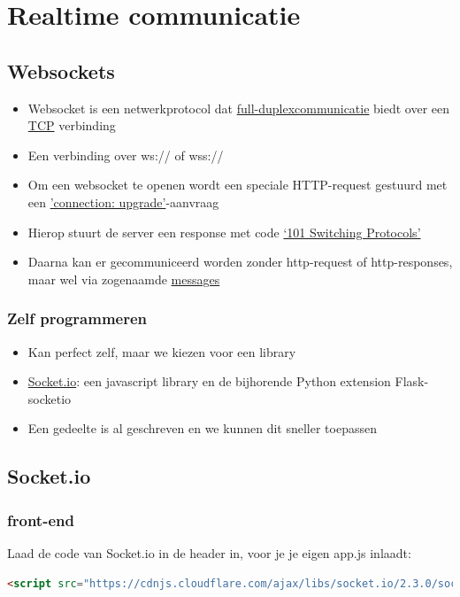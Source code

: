 \documentclass{article}
\begin{document}
\section{Realtime communicatie}
\subsection{Websockets}
\begin{itemize}
    \item Websocket is een netwerkprotocol dat \underline{full-duplexcommunicatie} biedt over een \underline{TCP} verbinding
    \item Een verbinding over ws:// of wss://
    \item Om een websocket te openen wordt een speciale HTTP-request gestuurd met een \underline{'connection: upgrade'}-aanvraag
    \item Hierop stuurt de server een response met code \underline{`101 Switching Protocols'}
    \item Daarna kan er gecommuniceerd worden zonder http-request of http-responses, maar wel via zogenaamde \underline{messages}
\end{itemize}

\subsubsection{Zelf programmeren}
\begin{itemize}
    \item Kan perfect zelf, maar we kiezen voor een library
    \item \underline{Socket.io}: een javascript library en de bijhorende Python extension Flask-socketio
    \item Een gedeelte is al geschreven en we kunnen dit sneller toepassen
\end{itemize}

\subsection{Socket.io}
\subsubsection{front-end}
Laad de code van Socket.io in de header in, voor je je eigen app.js inlaadt:
\begin{lstlisting}[language=HTML]
<script src="https://cdnjs.cloudflare.com/ajax/libs/socket.io/2.3.0/socket.io.js" integrity="sha256-bQmrZe4yPnQrLTY+1gYylfNMBuGfnT/HKsCGX+9Xuqo=" crossorigin="anonymous"></script>
\end{lstlisting}
\end{document}
